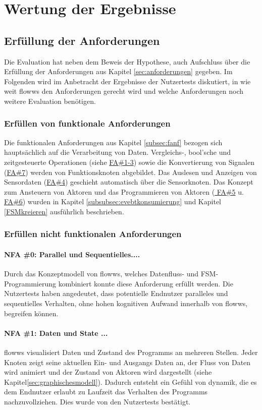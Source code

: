 \section{Wertung der Ergebnisse}

\subsection{Erfüllung der Anforderungen}
Die Evaluation hat neben dem Beweis der Hypothese, auch Aufschluss über die Erfüllung der Anforderungen aus Kapitel \ref{sec:anforderungen} gegeben. Im Folgenden wird im Anbetracht der Ergebnisse der Nutzertests diskutiert, in wie weit flowws den Anforderungen gerecht wird und welche Anforderungen noch weitere Evaluation benötigen.

\subsubsection{Erfüllen von funktionale Anforderungen}
Die funktionalen Anforderungen aus Kapitel \ref{subsec:fanf} bezogen sich hauptsächlich auf die Verarbeitung von Daten. Vergleichs-, bool'sche und zeitgesteuerte Operationen (siehe \hyperref[tab:fanf]{FA\#1-3}) sowie die Konvertierung von Signalen (\hyperref[tab:fanf]{FA\#7}) werden von Funktionsknoten abgebildet. Das Auslesen und Anzeigen von Sensordaten (\hyperref[tab:fanf]{FA\#4}) geschieht automatisch über die Sensorknoten. Das Konzept zum Ansteuern von Aktoren und das Programmieren von Aktoren (\hyperref[tab:fanf]{ FA\#5} u. \hyperref[tab:fanf]{ FA\#6}) wurden in Kapitel \ref{subsubsec:evebtkonsumierung} und Kapitel \ref{FSMkreieren} ausführlich beschrieben.

\subsubsection{Erfüllen nicht funktionalen Anforderungen}
\paragraph{NFA \#0: Parallel und Sequentielles....} Durch das Konzeptmodell von flowws, welches Datenfluss- und \ac{FSM}-Programmierung kombiniert konnte diese Anforderung erfüllt werden. Die Nutzertests haben angedeutet, dass potentielle Endnutzer paralleles und sequentielles Verhalten, ohne hohen kognitiven Aufwand innerhalb von flowws, begreifen können.

\paragraph{NFA \#1: Daten und State ...} flowws visualisiert Daten und Zustand des Programms an mehreren Stellen. Jeder Knoten zeigt seine aktuellen Ein- und Ausgangs Daten an, der Fluss von Daten wird animiert und der Zustand von Aktoren wird dargestellt (siehe Kapitel\ref{sec:graphischesmodell}). Dadurch entsteht ein Gefühl von dynamik, die es dem Endnutzer erlaubt zu Laufzeit das Verhalten des Programms nachzuvollziehen. Dies wurde von den Nutzertests bestätigt.

